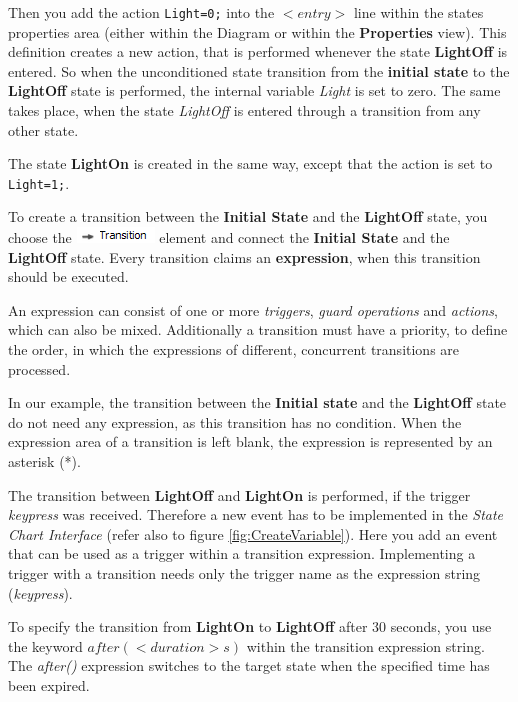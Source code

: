 Then you add the action \texttt{Light=0;} into the $<entry>$ line within the
states properties area (either within the Diagram or within the
\textbf{Properties} view). This definition creates a new action, that is
performed whenever the state \textbf{Light\-Off} is entered. So when the
unconditioned state transition from the \textbf{initial state} to the
\textbf{LightOff} state is performed, the internal variable \textit{Light} is set
to zero. The same takes place, when the state \textit{LightOff} is entered
through a transition from any other state.

The state \textbf{LightOn} is created in the same way, except that the action is
set to \texttt{Light=1;}.

To create a transition between the \textbf{Initial State} and the
\textbf{LightOff} state, you choose the
\includegraphics[height=12pt]{./Pictures/Transition} element and connect the
\textbf{Initial State} and the \textbf{LightOff} state. Every transition claims
an \textbf{expression}, when this transition should be executed.

An expression can consist of one or more \textit{triggers}, \textit{guard
operations} and \textit{actions}, which can also be mixed. Additionally a
transition must have a priority, to define the order, in which the expressions of
different, concurrent transitions are processed.

In our example, the transition between the \textbf{Initial state} and the
\textbf{LightOff} state do not need any expression, as this transition has no
condition. When the expression area of a transition is left blank, the expression
is represented by an asterisk (*).

The transition between \textbf{LightOff} and \textbf{LightOn} is performed, if
the trigger \textit{keypress} was received. Therefore a new event has to be
implemented in the \textit{State Chart Interface} (refer also to figure
\ref{fig:CreateVariable}). Here you add an event that can be used as a trigger
within a transition expression. Implementing a trigger with a transition needs
only the trigger name as the expression string (\textit{keypress}).

To specify the transition from \textbf{LightOn} to \textbf{LightOff} after 30
seconds, you use the keyword $after(<duration>s)$ within the transition
expression string. The \textit{after()} expression switches to the target state
when the specified time has been expired.

